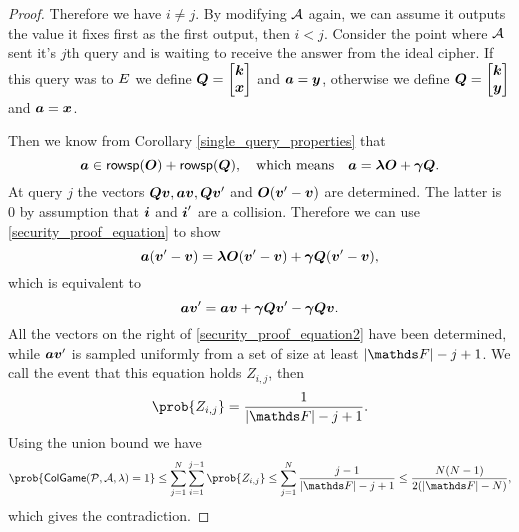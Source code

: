 \begin{proof}
    Therefore we have $i \neq j$.
    By modifying $\mathcal{A}$ again,
    we can assume it outputs the value it fixes first as the first output, then $i < j$.
    Consider the point where $\mathcal{A}$ sent it's $j$th query and is waiting to receive the answer from the ideal cipher.
    If this query was to $E$ we define $\boldsymbol{Q} = \begin{bmatrix}\boldsymbol k \\ \boldsymbol x\end{bmatrix}$ and $\boldsymbol a = \boldsymbol y$,
    otherwise we define $\boldsymbol{Q} = \begin{bmatrix}\boldsymbol k \\ \boldsymbol y\end{bmatrix}$ and $\boldsymbol a = \boldsymbol x$.
    
    Then we know from Corollary \ref{single_query_properties} that
    \begin{equation}
    \label{security_proof_equation}
    \boldsymbol a \in \mathsf{rowsp}(\boldsymbol{O}) + \mathsf{rowsp}(\boldsymbol{Q}) ,\quad \textrm{which means} \quad \boldsymbol a = \boldsymbol \lambda \boldsymbol{O} + \boldsymbol \gamma \boldsymbol{Q}.
    \end{equation}
    At query $j$ the vectors $\boldsymbol{Q}\boldsymbol v, \boldsymbol a\boldsymbol v, \boldsymbol{Q}\boldsymbol v'$ and $\boldsymbol{O}(\boldsymbol v' - \boldsymbol v)$ are determined.
    The latter is $0$ by assumption that $\boldsymbol i$ and $\boldsymbol i'$ are a collision.
    Therefore we can use \eqref{security_proof_equation} to show
    \begin{equation*}
    \boldsymbol a (\boldsymbol v' - \boldsymbol v) = \boldsymbol\lambda\boldsymbol{O}(\boldsymbol v' - \boldsymbol v) + \boldsymbol\gamma \boldsymbol{Q} (\boldsymbol v' - \boldsymbol v),
    \end{equation*}
    which is equivalent to
    \begin{equation}
    \label{security_proof_equation2}
    \boldsymbol a \boldsymbol v' = \boldsymbol a\boldsymbol v + \boldsymbol\gamma \boldsymbol{Q} \boldsymbol v' - \boldsymbol\gamma \boldsymbol{Q}\boldsymbol v.
    \end{equation}
    All the vectors on the right of \eqref{security_proof_equation2} have been determined,
    while $\boldsymbol a\boldsymbol v'$ is sampled uniformly from a set of size at least $|\F| - j + 1$.
    We call the event that this equation holds $Z_{i,j}$, then
    \[
        \prob{Z_{i,j}} = \frac{1}{|\F| - j + 1}.
    \]
    Using the union bound we have
    \begin{equation*}
    \prob{\mathsf{ColGame}(\P,\A,\lambda) = 1}
    \leq \sum_{j=1}^N \sum_{i=1}^{j-1} \prob{Z_{i,j}}
    \leq \sum_{j=1}^N \frac{j - 1}{|\F| - j + 1}
    \leq \frac{N(N-1)}{2(|\F| - N)},
    \end{equation*}
    which gives the contradiction.
\end{proof}
